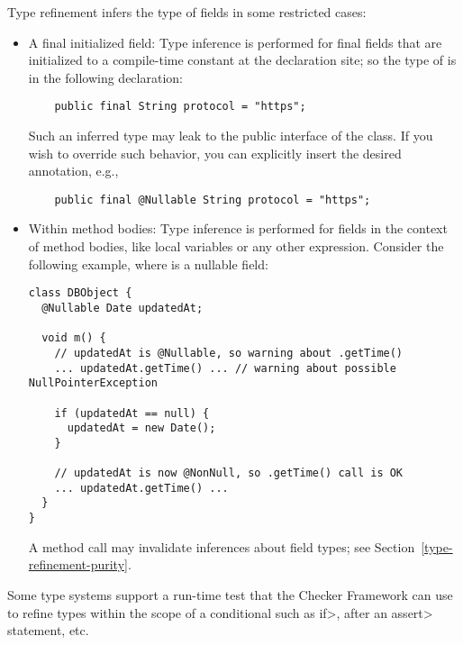 
Type refinement infers the type of fields in some restricted cases:

\begin{itemize}

\item
A final initialized field:
Type inference is performed for final fields that are initialized to a
compile-time constant at the declaration site; so the type of 
is  in the following declaration:

\begin{Verbatim}
    public final String protocol = "https";
\end{Verbatim}

Such an inferred type may leak to the public interface of the class.
If you wish to override such behavior, you can explicitly insert the desired
annotation, e.g.,

\begin{Verbatim}
    public final @Nullable String protocol = "https";
\end{Verbatim}

\item
Within method bodies:
Type inference is performed for fields in the context of method bodies,
like local variables or any other expression.
Consider the following example, where  is a nullable
field:

\begin{Verbatim}
class DBObject {
  @Nullable Date updatedAt;

  void m() {
    // updatedAt is @Nullable, so warning about .getTime()
    ... updatedAt.getTime() ... // warning about possible NullPointerException

    if (updatedAt == null) {
      updatedAt = new Date();
    }

    // updatedAt is now @NonNull, so .getTime() call is OK
    ... updatedAt.getTime() ...
  }
}
\end{Verbatim}

A method call may invalidate inferences about field types; see
Section~\ref{type-refinement-purity}.

\end{itemize}



Some type systems support a run-time test that the Checker Framework can
use to refine types within the scope of a conditional such as \<if>, after
an \<assert> statement, etc.

